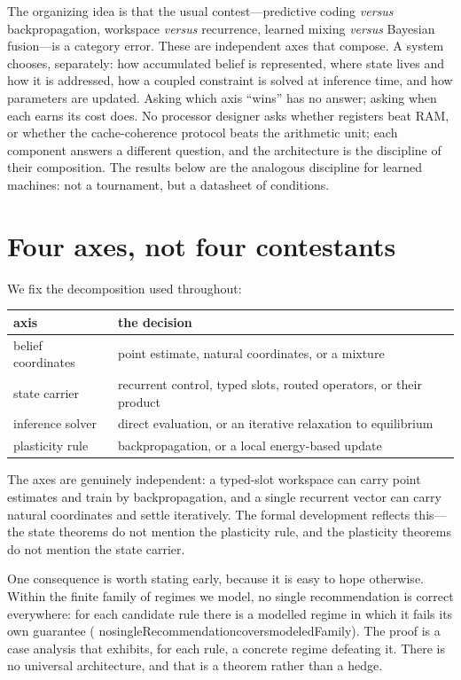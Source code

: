 \documentclass[11pt]{article}
\newcommand{\leanname}[1]{{\scriptsize\ttfamily
  \def\_{\textunderscore\allowbreak}#1}}
\begin{document}
The organizing idea is that the usual contest---predictive coding \emph{versus}
backpropagation, workspace \emph{versus} recurrence, learned mixing \emph{versus} Bayesian
fusion---is a category error. These are independent axes that compose. A system chooses,
separately: how accumulated belief is represented, where state lives and how it is
addressed, how a coupled constraint is solved at inference time, and how parameters are
updated. Asking which axis ``wins'' has no answer; asking when each earns its cost does.
No processor designer asks whether registers beat RAM, or whether the cache-coherence
protocol beats the arithmetic unit; each component answers a different question, and the
architecture is the discipline of their composition. The results below are the analogous
discipline for learned machines: not a tournament, but a datasheet of conditions.

\section{Four axes, not four contestants}
\label{sec:axes}

We fix the decomposition used throughout:

\begin{center}
\begin{tabular}{@{}ll@{}}
\toprule
axis & the decision \\
\midrule
belief coordinates & point estimate, natural coordinates, or a mixture \\
state carrier & recurrent control, typed slots, routed operators, or their product \\
inference solver & direct evaluation, or an iterative relaxation to equilibrium \\
plasticity rule & backpropagation, or a local energy-based update \\
\bottomrule
\end{tabular}
\end{center}

The axes are genuinely independent: a typed-slot workspace can carry point estimates and
train by backpropagation, and a single recurrent vector can carry natural coordinates and
settle iteratively. The formal development reflects this---the state theorems do not
mention the plasticity rule, and the plasticity theorems do not mention the state carrier.

One consequence is worth stating early, because it is easy to hope otherwise. Within the
finite family of regimes we model, no single recommendation is correct everywhere: for
each candidate rule there is a modelled regime in which it fails its own guarantee
(\leanname{no\_singleRecommendation\_covers\_modeledFamily}). The proof is a case analysis
that exhibits, for each rule, a concrete regime defeating it. There is no universal
architecture, and that is a theorem rather than a hedge.
\end{document}
